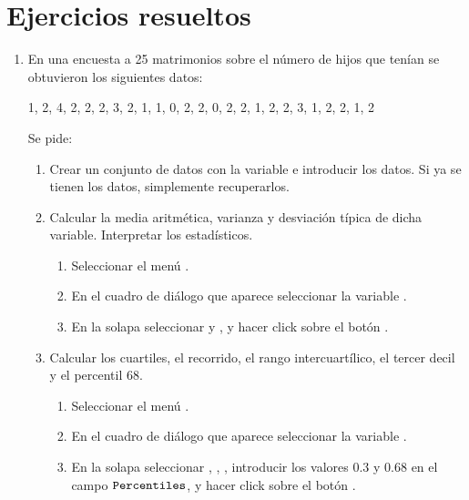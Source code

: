 \section{Ejercicios resueltos}
\begin{enumerate}[leftmargin=*]
\item En una encuesta a 25 matrimonios sobre el número de hijos que tenían se obtuvieron los siguientes datos:
\begin{center}
1, 2, 4, 2, 2, 2, 3, 2, 1, 1, 0, 2, 2, 0, 2, 2, 1, 2, 2, 3, 1, 2, 2, 1, 2
\end{center}
Se pide:
\begin{enumerate}
\item Crear un conjunto de datos con la variable  e introducir los datos. 
Si ya se tienen los datos, simplemente recuperarlos.

\item Calcular la media aritmética, varianza y desviación típica de dicha variable.
Interpretar los estadísticos. 
\begin{indicacion}{
\begin{enumerate}
\item Seleccionar el menú .
\item En el cuadro de diálogo que aparece seleccionar la variable .
\item En la solapa  seleccionar  y , y hacer
click sobre el botón .
\end{enumerate}}
\end{indicacion}

\item Calcular los cuartiles, el recorrido, el rango intercuartílico, el tercer decil y el percentil 68. 
\begin{indicacion}{
\begin{enumerate}
\item Seleccionar el menú .
\item En el cuadro de diálogo que aparece seleccionar la variable .
\item En la solapa  seleccionar , , , introducir los valores $0.3$ y $0.68$ en el campo $\texttt{Percentiles}$, y hacer click sobre el botón
.
\end{enumerate}}
\end{indicacion}
\end{enumerate}


\end{enumerate}
